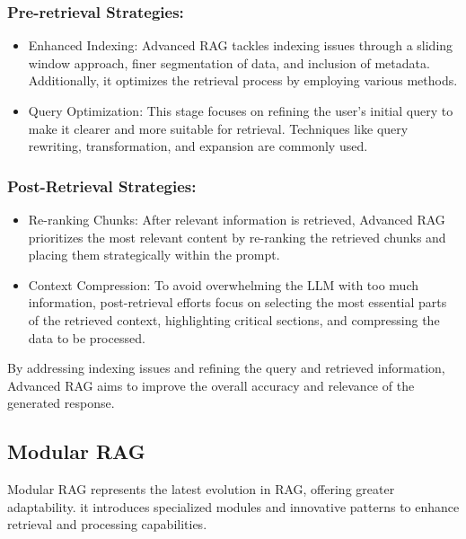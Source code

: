 \subsubsection{Pre-retrieval Strategies:}
\begin{itemize}
	\item Enhanced Indexing: Advanced RAG tackles indexing issues through a sliding window approach, finer segmentation of data, and inclusion of metadata. Additionally, it optimizes the retrieval process by employing various methods.
	\item Query Optimization: This stage focuses on refining the user's initial query to make it clearer and more suitable for retrieval. Techniques like query rewriting, transformation, and expansion are commonly used.
\end{itemize}
\subsubsection{Post-Retrieval Strategies:}
\begin{itemize}
	\item Re-ranking Chunks: After relevant information is retrieved, Advanced RAG prioritizes the most relevant content by re-ranking the retrieved chunks and placing them strategically within the prompt.
	\item Context Compression: To avoid overwhelming the LLM with too much information, post-retrieval efforts focus on selecting the most essential parts of the retrieved context, highlighting critical sections, and compressing the data to be processed.
\end{itemize}
By addressing indexing issues and refining the query and retrieved information, Advanced RAG aims to improve the overall accuracy and relevance of the generated response.
\subsection{Modular RAG} 
Modular RAG represents the latest evolution in RAG, offering greater adaptability. it introduces specialized modules and innovative patterns to enhance retrieval and processing capabilities.
